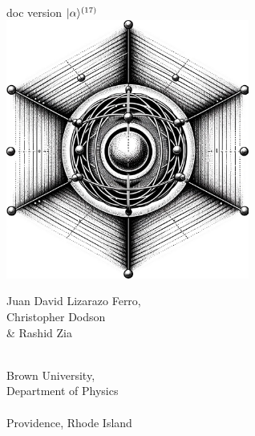 \documentclass[11pt, twoside,openright]{article}
\begin{document}
 

\begin{titlepage} %
    \centering
    \vspace*{\fill}
    
    {\Large\qlanth}\\
    {\large doc version $|\alpha\rangle^{(17)}$} \\
    \vspace*{0.5cm}
    \includegraphics[width=0.6\textwidth]{ion_in_lattice.jpg}  %
    \vspace*{0.4cm} %
    
    {\large Juan David Lizarazo Ferro,}\\
    {\large Christopher Dodson}\\
    {\large \& Rashid Zia}\\
    
	\vspace*{\fill}
\end{titlepage}

\newpage

\thispagestyle{empty}
\vspace*{\fill}
\begin{center}
$\,$ \\
{\large Brown University, \\ Department of Physics}\\
\vspace{0.2cm}
\hrulefill \\
\vspace{0.2cm}
Providence, Rhode Island \\
\end{center}
\end{document}
